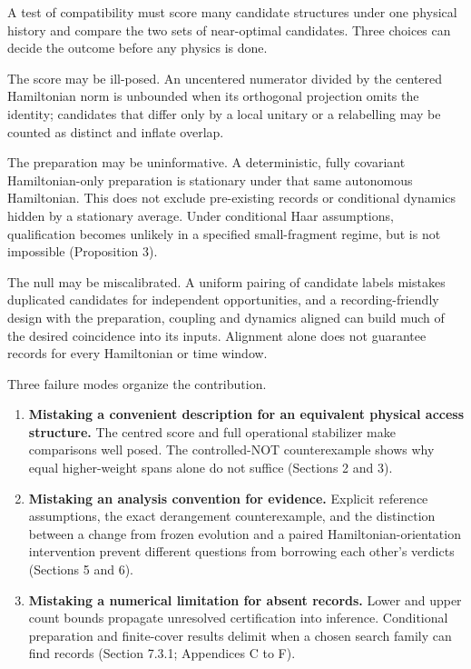 \documentclass[
  10pt,
  a4paper,
]{article}
\makeatletter
\providecommand{\tightlist}{%
  \setlength{\itemsep}{0pt}\setlength{\parskip}{0pt}}
\renewcommand\subsection{\@startsection{subsection}{2}{\z@}{-2ex \@plus -.8ex \@minus -.2ex}{.9ex \@plus .2ex}{\normalfont\large\bfseries}}
\makeatother
\begin{document}
A test of compatibility must score many candidate structures under one
physical history and compare the two sets of near-optimal candidates.
Three choices can decide the outcome before any physics is done.

The score may be ill-posed. An uncentered numerator divided by the
centered Hamiltonian norm is unbounded when its orthogonal projection
omits the identity; candidates that differ only by a local unitary or a
relabelling may be counted as distinct and inflate overlap.

The preparation may be uninformative. A deterministic, fully covariant
Hamiltonian-only preparation is stationary under that same autonomous
Hamiltonian. This does not exclude pre-existing records or conditional
dynamics hidden by a stationary average. Under conditional Haar
assumptions, qualification becomes unlikely in a specified
small-fragment regime, but is not impossible (Proposition 3).

The null may be miscalibrated. A uniform pairing of candidate labels
mistakes duplicated candidates for independent opportunities, and a
recording-friendly design with the preparation, coupling and dynamics
aligned can build much of the desired coincidence into its inputs.
Alignment alone does not guarantee records for every Hamiltonian or time
window.

\subsection{1.3 Contributions}\label{contributions}

Three failure modes organize the contribution.

\begin{enumerate}
\def\labelenumi{\arabic{enumi}.}
\tightlist
\item
  \textbf{Mistaking a convenient description for an equivalent physical
  access structure.} The centred score and full operational stabilizer
  make comparisons well posed. The controlled-NOT counterexample shows
  why equal higher-weight spans alone do not suffice (Sections 2 and 3).
\item
  \textbf{Mistaking an analysis convention for evidence.} Explicit
  reference assumptions, the exact derangement counterexample, and the
  distinction between a change from frozen evolution and a paired
  Hamiltonian-orientation intervention prevent different questions from
  borrowing each other's verdicts (Sections 5 and 6).
\item
  \textbf{Mistaking a numerical limitation for absent records.} Lower
  and upper count bounds propagate unresolved certification into
  inference. Conditional preparation and finite-cover results delimit
  when a chosen search family can find records (Section 7.3.1;
  Appendices C to F).
\end{enumerate}
\end{document}
